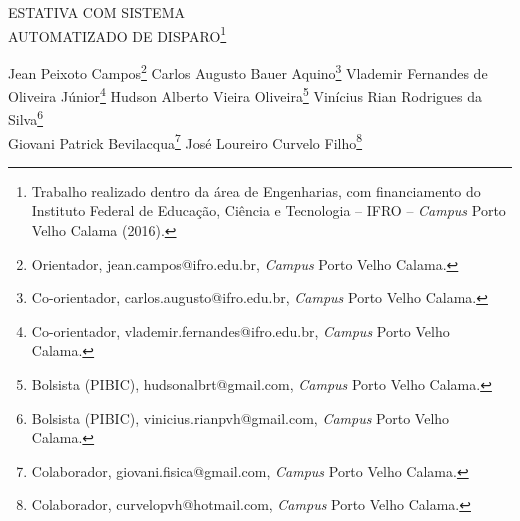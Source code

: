 \documentclass[article,12pt,onesidea,4paper,english,brazil]{abntex2}
\begin{document}
	
	
	\frenchspacing 
	
	\begin{center}
		\LARGE ESTATIVA COM SISTEMA\\AUTOMATIZADO DE DISPARO\footnote{Trabalho realizado dentro da área de Engenharias, com financiamento do Instituto Federal de Educação, Ciência e Tecnologia – IFRO – \textit{Campus} Porto Velho Calama (2016).}
		
		\normalsize
		Jean Peixoto Campos\footnote{Orientador, jean.campos@ifro.edu.br, \textit{Campus} Porto Velho Calama.} 
		Carlos Augusto Bauer Aquino\footnote{Co-orientador, carlos.augusto@ifro.edu.br, \textit{Campus} Porto Velho Calama.} 
		Vlademir Fernandes de Oliveira Júnior\footnote{Co-orientador, vlademir.fernandes@ifro.edu.br, \textit{Campus} Porto Velho Calama.} 
		Hudson Alberto Vieira Oliveira\footnote{Bolsista (PIBIC), hudsonalbrt@gmail.com, \textit{Campus} Porto Velho Calama.}
		Vinícius Rian Rodrigues da Silva\footnote{Bolsista (PIBIC), vinicius.rianpvh@gmail.com, \textit{Campus} Porto Velho Calama.}\\
		Giovani Patrick Bevilacqua\footnote{Colaborador, giovani.fisica@gmail.com, \textit{Campus} Porto Velho Calama.}
		José Loureiro Curvelo Filho\footnote{Colaborador, curvelopvh@hotmail.com, \textit{Campus} Porto Velho Calama.} 
	\end{center}
	
\end{document}
